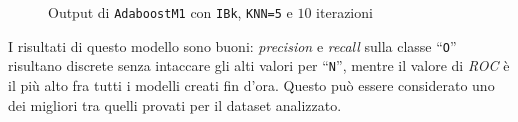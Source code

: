 \begin{figure}[H]
  \centering
  \caption{Output di \texttt{AdaboostM1} con \texttt{IBk}, \texttt{KNN=5} e \(10\) iterazioni}%
  \label{fig:adaboost:ibk5}
\end{figure}

I risultati di questo modello sono buoni: \emph{precision} e \emph{recall} sulla classe ``\texttt{O}'' risultano discrete senza intaccare gli alti valori per ``\texttt{N}'',
mentre il valore di \emph{ROC} è il più alto fra tutti i modelli creati fin d'ora. Questo può essere considerato uno dei migliori tra quelli provati per il dataset analizzato.
